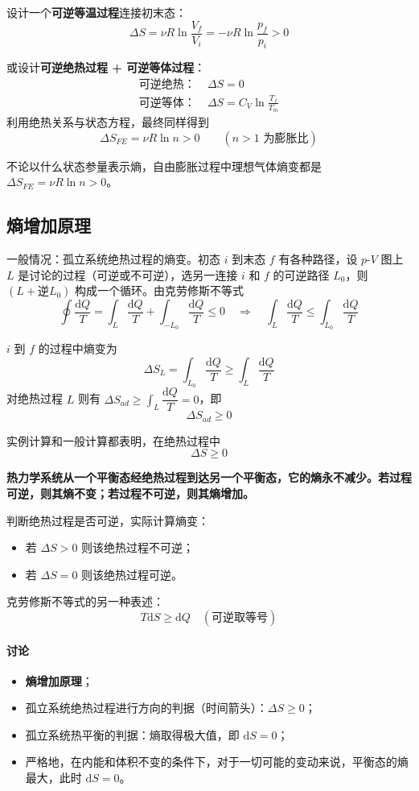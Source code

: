 \documentclass[UTF8]{ctexart}
\begin{document}
设计一个\textbf{可逆等温过程}连接初末态：
\[
\Delta S=\nu R\ln\frac{V_f}{V_i}=-\nu R\ln\frac{p_f}{p_i}>0
\]

或设计\textbf{可逆绝热过程 + 可逆等体过程}：
\begin{align*}
\text{可逆绝热：}&\;\Delta S=0\\
\text{可逆等体：}&\;\Delta S=C_V\ln\frac{T_f}{T_m}
\end{align*}
利用绝热关系与状态方程，最终同样得到
\[
\boxed{\Delta S_{FE}=\nu R\ln n>0}\qquad(n>1\text{ 为膨胀比})
\]

不论以什么状态参量表示熵，自由膨胀过程中理想气体熵变都是 $\Delta S_{FE}=\nu R\ln n>0$。

\subsection{熵增加原理}

一般情况：孤立系统绝热过程的熵变。初态 $i$ 到末态 $f$ 有各种路径，设 $p$-$V$ 图上 $L$ 是讨论的过程（可逆或不可逆），选另一连接 $i$ 和 $f$ 的可逆路径 $L_0$，则 $(L+\text{逆}L_0)$ 构成一个循环。由克劳修斯不等式
\[
\oint\frac{\mathrm{d}Q}{T}=\int_L\frac{\mathrm{d}Q}{T}+\int_{-L_0}\frac{\mathrm{d}Q}{T}\le 0
\quad\Longrightarrow\quad
\int_L\frac{\mathrm{d}Q}{T}\le\int_{L_0}\frac{\mathrm{d}Q}{T}
\]

$i$ 到 $f$ 的过程中熵变为
\[
\Delta S_L=\int_{L_0}\frac{\mathrm{d}Q}{T}\ge\int_L\frac{\mathrm{d}Q}{T}
\]
对绝热过程 $L$ 则有 $\Delta S_{ad}\ge\displaystyle\int_L\dfrac{\mathrm{d}Q}{T}=0$，即
\[
\boxed{\Delta S_{ad}\ge 0}
\]

实例计算和一般计算都表明，在绝热过程中
\[
\boxed{\Delta S\ge 0}
\]

\textbf{热力学系统从一个平衡态经绝热过程到达另一个平衡态，它的熵永不减少。若过程可逆，则其熵不变；若过程不可逆，则其熵增加。}

判断绝热过程是否可逆，实际计算熵变：
\begin{itemize}[leftmargin=2em]
  \item 若 $\Delta S>0$ 则该绝热过程不可逆；
  \item 若 $\Delta S=0$ 则该绝热过程可逆。
\end{itemize}

克劳修斯不等式的另一种表述：
\[
\boxed{T\mathrm{d}S\ge \mathrm{d}Q}\quad(\text{可逆取等号})
\]

\paragraph{讨论}
\begin{itemize}[leftmargin=2em]
  \item \textbf{熵增加原理}；
  \item 孤立系统绝热过程进行方向的判据（时间箭头）：$\Delta S\ge 0$；
  \item 孤立系统热平衡的判据：熵取得极大值，即 $\mathrm{d}S=0$；
  \item 严格地，在内能和体积不变的条件下，对于一切可能的变动来说，平衡态的熵最大，此时 $\mathrm{d}S=0$。
\end{itemize}
\end{document}
